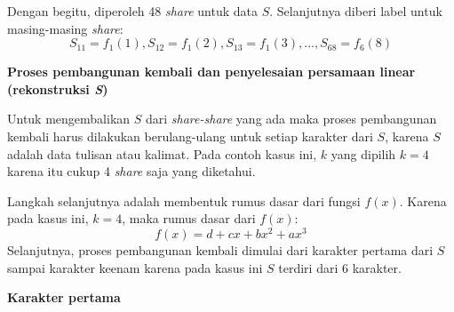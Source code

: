 Dengan begitu, diperoleh 48 \textit{share} untuk data \begin{math}S\end{math}. Selanjutnya diberi label untuk masing-masing \textit{share}:
\begin{displaymath}
	S_{11} = f_1(1), S_{12} = f_1(2), S_{13} = f_1(3), ... , S_{68} = f_6(8)
\end{displaymath}

\begin{flushleft}
	\textbf{Proses pembangunan kembali dan penyelesaian persamaan linear (rekonstruksi \textit{S})}
\end{flushleft}

Untuk mengembalikan \begin{math}S\end{math} dari \textit{share-share} yang ada maka proses pembangunan kembali harus dilakukan berulang-ulang untuk setiap karakter dari \begin{math}S\end{math}, karena \begin{math}S\end{math} adalah data tulisan atau kalimat. Pada contoh kasus ini, \begin{math}k\end{math} yang dipilih \begin{math}k=4\end{math} karena itu cukup 4 \textit{share} saja yang diketahui.

Langkah selanjutnya adalah membentuk rumus dasar dari fungsi \begin{math}f(x)\end{math}. Karena pada kasus ini, \begin{math}k=4\end{math}, maka rumus dasar dari \begin{math}f(x)\end{math}:
\begin{displaymath}
	f(x) = d + cx + bx^2 + ax^3
\end{displaymath}
Selanjutnya, proses pembangunan kembali dimulai dari karakter pertama dari \begin{math}S\end{math} sampai karakter keenam karena pada kasus ini \begin{math}S\end{math} terdiri dari 6 karakter.

\begin{flushleft}
	\textbf{Karakter pertama}
\end{flushleft}

